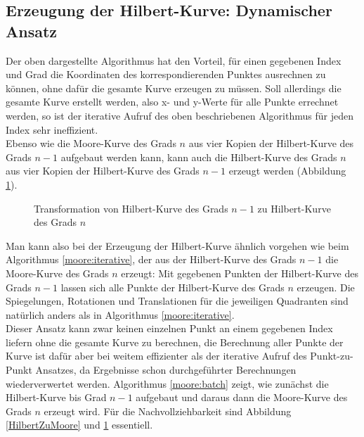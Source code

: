 \documentclass[course=erap]{aspdoc}
\begin{document}
\FloatBarrier
\subsection{Erzeugung der Hilbert-Kurve: Dynamischer Ansatz}
Der oben dargestellte Algorithmus hat den Vorteil, für einen gegebenen Index und Grad die Koordinaten des korrespondierenden Punktes ausrechnen zu können, ohne dafür die gesamte Kurve erzeugen zu müssen.
Soll allerdings die gesamte Kurve erstellt werden, also x- und y-Werte für alle Punkte errechnet werden, so ist der iterative Aufruf des oben beschriebenen Algorithmus für jeden Index sehr ineffizient.\\
Ebenso wie die Moore-Kurve des Grads $n$ aus vier Kopien der Hilbert-Kurve des Grads $n-1$ aufgebaut werden kann, kann auch die Hilbert-Kurve des Grads $n$ aus vier Kopien der Hilbert-Kurve des Grads $n-1$ erzeugt werden (Abbildung \ref{HilbertZuHilbert}).
\begin{figure}[h]
\centering
\def\svgwidth{240pt}

\caption{Transformation von Hilbert-Kurve des Grads $n-1$ zu Hilbert-Kurve des Grads $n$}
\label{HilbertZuHilbert}
\end{figure}
Man kann also bei der Erzeugung der Hilbert-Kurve ähnlich vorgehen wie beim Algorithmus \ref{moore:iterative}, der aus der Hilbert-Kurve des Grads $n-1$ die Moore-Kurve des Grads $n$ erzeugt: Mit gegebenen Punkten der Hilbert-Kurve des Grads $n-1$ lassen sich alle Punkte der Hilbert-Kurve des Grads $n$ erzeugen. 
Die Spiegelungen, Rotationen und Translationen für die jeweiligen Quadranten sind natürlich anders als in Algorithmus \ref{moore:iterative}. \\
Dieser Ansatz kann zwar keinen einzelnen Punkt an einem gegebenen Index liefern ohne die gesamte Kurve zu berechnen,  die Berechnung aller Punkte der Kurve ist dafür aber bei weitem effizienter als der iterative Aufruf des Punkt-zu-Punkt Ansatzes, da Ergebnisse schon durchgeführter Berechnungen wiederverwertet werden. Algorithmus \ref{moore:batch} zeigt, wie zunächst die Hilbert-Kurve bis Grad $n-1$ aufgebaut und daraus dann die Moore-Kurve des Grads $n$ erzeugt wird. Für die Nachvollziehbarkeit sind Abbildung \ref{HilbertZuMoore} und \ref{HilbertZuHilbert} essentiell.


\FloatBarrier
\end{document}
